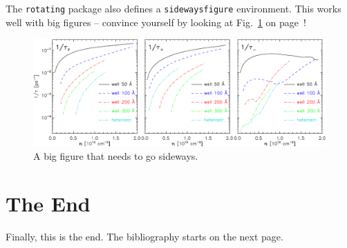 The \texttt{rotating} package also defines a \texttt{sidewaysfigure}
environment. This works well with big figures -- convince yourself
by looking at Fig.~\ref{fig:sidewaysF} on page~\pageref{fig:sidewaysF}!

\begin{figure}
  \includegraphics[width=\textwidth]{bigfig}

  \caption{\label{fig:sidewaysF}A big figure that needs to go
   sideways.}
\end{figure}

\section{The End}
\label{sec:end}

Finally, this is the end.  The bibliography starts on
the next page.


